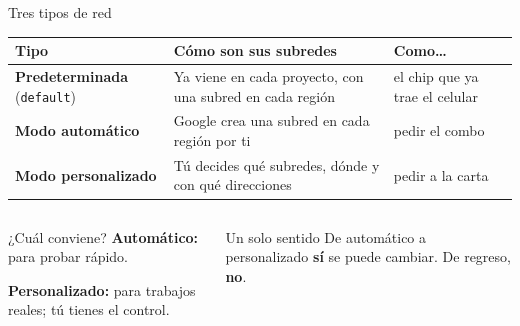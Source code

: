 \documentclass[aspectratio=169,10pt,c]{beamer}
\begin{document}
\begin{frame}{Tres tipos de red}
\renewcommand{\arraystretch}{1.35}
\centering\small
\begin{tabular}{@{}>{\raggedright\arraybackslash}p{3.0cm}>{\raggedright\arraybackslash}p{5.6cm}p{4.2cm}@{}}
\toprule
\textbf{Tipo} & \textbf{Cómo son sus subredes} & \textbf{Como\ldots}\\
\midrule
\textbf{Predeterminada} (\texttt{default}) & Ya viene en cada proyecto, con una subred en cada región & el chip que ya trae el celular\\
\textbf{Modo automático} & Google crea una subred en cada región por ti & pedir el combo\\
\textbf{Modo personalizado} & Tú decides qué subredes, dónde y con qué direcciones & pedir a la carta\\
\bottomrule
\end{tabular}
\par\vspace{3mm}
\begin{columns}[T,onlytextwidth]
\begin{exampleblock}{¿Cuál conviene?}
\small \textbf{Automático:} para probar rápido.\par
\textbf{Personalizado:} para trabajos reales; tú tienes el control.
\end{exampleblock}
\begin{alertblock}{Un solo sentido}
\small De automático a personalizado \textbf{sí} se puede cambiar. De regreso, \textbf{no}.
\end{alertblock}
\end{columns}
\end{frame}
\end{document}
